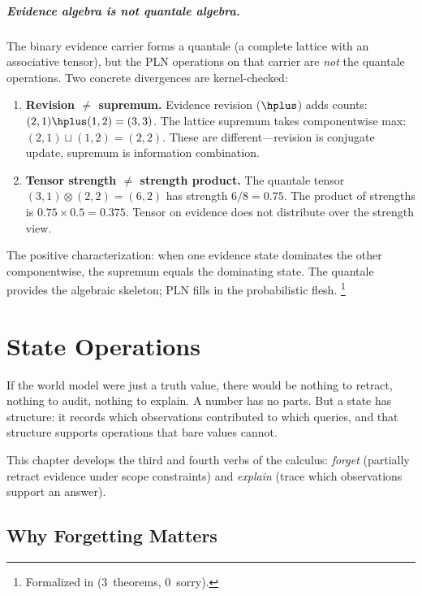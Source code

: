 \documentclass[11pt,openany]{report}
\begin{document}
\paragraph{Evidence algebra is not quantale algebra.}
The binary evidence carrier forms a quantale (a complete lattice
with an associative tensor), but the PLN operations on that
carrier are \emph{not} the quantale operations.  Two concrete
divergences are kernel-checked:
\begin{enumerate}
\item \textbf{Revision $\neq$ supremum.}  Evidence revision
  ($\hplus$) adds counts: $(2,1) \hplus (1,2) = (3,3)$.  The
  lattice supremum takes componentwise max: $(2,1) \sqcup (1,2) =
  (2,2)$.  These are different---revision is conjugate update,
  supremum is information combination.
\item \textbf{Tensor strength $\neq$ strength product.}  The
  quantale tensor $(3,1) \otimes (2,2) = (6,2)$ has strength
  $6/8 = 0.75$.  The product of strengths is $0.75 \times 0.5 =
  0.375$.  Tensor on evidence does not distribute over the
  strength view.
\end{enumerate}
The positive characterization: when one evidence state dominates
the other componentwise, the supremum equals the dominating
state.  The quantale provides the algebraic skeleton; PLN fills
in the probabilistic flesh.%
\footnote{Formalized in
(3~theorems, 0~sorry).}


\chapter{State Operations}
\label{ch:state-ops}

If the world model were just a truth value, there would be nothing to
retract, nothing to audit, nothing to explain.  A number has no parts.
But a state has structure: it records which observations contributed to
which queries, and that structure supports operations that bare values
cannot.

This chapter develops the third and fourth verbs of the calculus:
\emph{forget} (partially retract evidence under scope constraints) and
\emph{explain} (trace which observations support an answer).

\section{Why Forgetting Matters}
\end{document}
